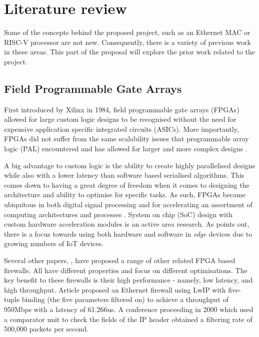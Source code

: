 \chapter[Literature review]{Literature review }
\label{Chap:label}	%
\pagestyle{headings}



Some of the concepts behind the proposed project, such as an Ethernet MAC or RISC-V processor are not new. Consequently, there is a variety of previous work 
in these areas. This part of the proposal will explore the prior work related to the project. 


\section{Field Programmable Gate Arrays}
\label{subsection:fpga}	
First introduced by Xilinx in 1984, field programmable gate arrays (FPGAs) allowed for large custom logic designs to be recognised without the need for 
expensive application specific integrated circuits (ASICs). More importantly, FPGAs did not suffer from the same scalability issues that
programmable array logic (PAL) encountered and has allowed for larger and more complex designs \cite{30YearsOfFPGA}. 

A big advantage to custom logic is the ability to create highly parallelised designs while also with a lower latency than software based serialised algorithms. This comes down to 
having a great degree of freedom when it comes to designing the architecture and ability to optimise for specific tasks.
As such, FPGAs became ubiquitous in both digital signal processing and for accelerating an assortment of computing architectures and processes \cite{FPGAComputing}.
System on chip (SoC) design with custom hardware acceleration modules is an active area research. As \cite{FPGAComputing} points out, there is a focus towards 
using both hardware and software in \textit{edge} devices due to growing numbers of IoT devices.


Several other papers, \cite{LwIPFPGAFirewall} \cite{IPFPGAFirewall2000} \cite{packetFilteringFPGA}, have proposed a range of other related FPGA based firewalls. All have 
different properties and focus on different optimisations. The key benefit to these firewalls is their high performance - namely, low latency, and high throughput. 
Article \cite{LwIPFPGAFirewall} proposed an Ethernet firewall using LwIP with five-tuple binding (the five parameters filtered on) 
to achieve a throughput of 950Mbps with a latency of 61.266us. A conference proceeding in 2000 \cite{IPFPGAFirewall2000} which used a comparator unit to check the 
fields of the IP header obtained a filtering rate of 500,000 packets per second. 


